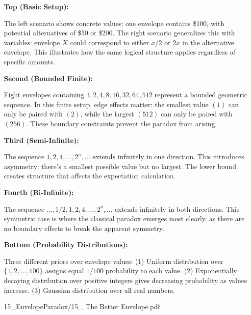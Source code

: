 \begin{SideNotePage}{
  \textbf{Top (Basic Setup):} \par The left scenario shows concrete values: one envelope contains \$100, with potential alternatives of \$50 or \$200. The right scenario generalizes this with variables: envelope $X$ could correspond to either $x/2$ or $2x$ in the alternative envelope. This illustrates how the same logical structure applies regardless of specific amounts.

  \vspace{1em}
  \textbf{Second (Bounded Finite):} \par Eight envelopes containing $1, 2, 4, 8, 16, 32, 64, 512$ represent a bounded geometric sequence. In this finite setup, edge effects matter: the smallest value $(1)$ can only be paired with $(2)$, while the largest $(512)$ can only be paired with $(256)$. These boundary constraints prevent the paradox from arising.

  \vspace{1em}
  \textbf{Third (Semi-Infinite):} \par The sequence $1, 2, 4, \ldots, 2^n, \ldots$ extends infinitely in one direction. This introduces asymmetry: there's a smallest possible value but no largest. The lower bound creates structure that affects the expectation calculation.

  \vspace{1em}
  \textbf{Fourth (Bi-Infinite):} \par The sequence $\ldots, 1/2, 1, 2, 4, \ldots, 2^n, \ldots$ extends infinitely in both directions. This symmetric case is where the classical paradox emerges most clearly, as there are no boundary effects to break the apparent symmetry.

  \vspace{1em}
  \textbf{Bottom (Probability Distributions):} \par Three different priors over envelope values: (1) Uniform distribution over $\{1, 2, \ldots, 100\}$ assigns equal $1/100$ probability to each value. (2) Exponentially decaying distribution over positive integers gives decreasing probability as values increase. (3) Gaussian distribution over all real numbers.
}{15_EnvelopeParadox/15_ The Better Envelope.pdf}
\end{SideNotePage}